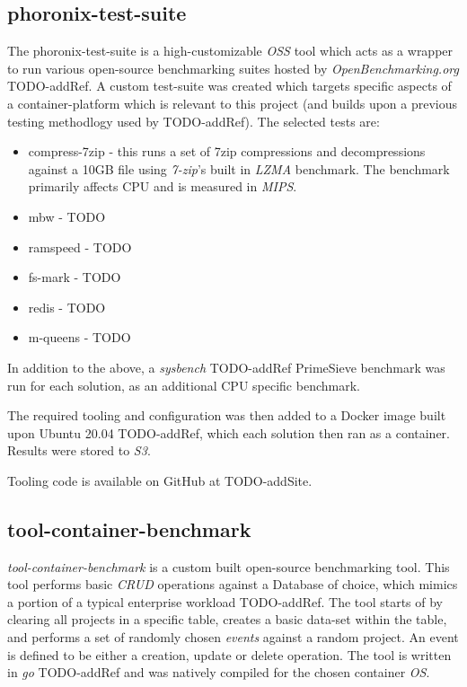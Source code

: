 \subsection{phoronix-test-suite}
The phoronix-test-suite is a high-customizable \emph{OSS} tool which acts as a wrapper to run various open-source benchmarking suites hosted by \emph{OpenBenchmarking.org} TODO-addRef.
A custom test-suite was created which targets specific aspects of a container-platform which is relevant to this project (and builds upon a previous testing methodlogy used by TODO-addRef).
The selected tests are:
\begin{itemize}
  \item compress-7zip - this runs a set of 7zip compressions and decompressions against a 10GB file using \emph{7-zip}'s built in \emph{LZMA} benchmark.
        The benchmark primarily affects CPU and is measured in \emph{MIPS}.
  \item mbw - TODO
  \item ramspeed - TODO
  \item fs-mark - TODO
  \item redis - TODO
  \item m-queens - TODO
\end{itemize}
In addition to the above, a \emph{sysbench} TODO-addRef PrimeSieve benchmark was run for each solution, as an additional CPU specific benchmark.


The required tooling and configuration was then added to a Docker image built upon Ubuntu 20.04 TODO-addRef, which each solution then ran as a container.
Results were stored to \emph{S3}.

Tooling code is available on GitHub at TODO-addSite.

\subsection{tool-container-benchmark}
\textit{tool-container-benchmark} is a custom built open-source benchmarking tool. This tool performs basic \emph{CRUD} operations against a Database of choice,
which mimics a portion of a typical enterprise workload TODO-addRef. The tool starts of by clearing all projects in a specific table, creates a basic data-set within the table,
and performs a set of randomly chosen \textit{events} against a random project. An event is defined to be either a creation, update or delete operation.
The tool is written in \emph{go} TODO-addRef and was natively compiled for the chosen container \emph{OS}.

